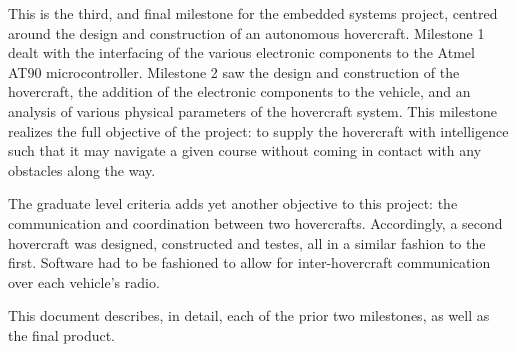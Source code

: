 This is the third, and final milestone for the embedded systems project, centred around the design and construction of an autonomous hovercraft.  Milestone 1 dealt with the interfacing of the various electronic components to the Atmel AT90 microcontroller.  Milestone 2 saw the design and construction of the hovercraft, the addition of the electronic components to the vehicle, and an analysis of various physical parameters of the hovercraft system.  This milestone realizes the full objective of the project: to supply the hovercraft with intelligence such that it may navigate a given course without coming in contact with any obstacles along the way.  

The graduate level criteria adds yet another objective to this project: the communication and coordination between two hovercrafts.  Accordingly, a second hovercraft was designed, constructed and testes, all in a similar fashion to the first.  Software had to be fashioned to allow for inter-hovercraft communication over each vehicle's radio.  

This document describes, in detail, each of the prior two milestones, as well as the final product.  